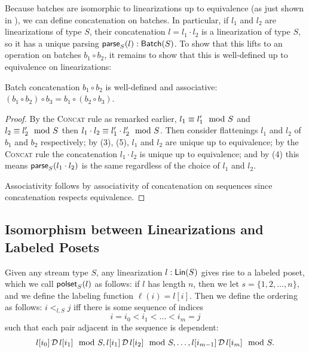 Because batches are isomorphic to linearizations up to equivalence (as just shown in ), we can define concatenation on batches. In particular, if $l_1$ and $l_2$ are linearizations of type $S$,
their concatenation $l = l_1 \cdot l_2$ is a linearization of type $S$,
so it has a unique parsing $\batchtype{\parselin{l}{S}}{S}$.
To show that this lifts to an operation on batches $b_1 \circ b_2$, it remains to show that this is well-defined up to equivalence on linearizations:
\begin{proposition}
\label{batch-concatenation-well-defined}
Batch concatenation $b_1 \circ b_2$ is well-defined and associative: $(b_1 \circ b_2) \circ b_3 = b_1 \circ (b_2 \circ b_3)$.
\end{proposition}
\begin{proof}
By the \textsc{Concat} rule as remarked earlier, $\equivtype{l_1}{l_1'}{S}$ and $\equivtype{l_2}{l_2'}{S}$
then $\equivtype{l_1 \cdot l_2}{l_1' \cdot l_2'}{S}$.
Then consider flattenings $l_1$ and $l_2$ of $b_1$ and $b_2$ respectively;
by  (3), (5),
$l_1$ and $l_2$ are unique up to equivalence;
by the \textsc{Concat} rule the concatenation $l_1 \cdot l_2$ is unique up to equivalence;
and by  (4)
this means $\parselin{l_1 \cdot l_2}{S}$ is the same regardless of the choice of $l_1$ and $l_2$.

Associativity follows by associativity of concatenation on sequences since concatenation respects equivalence.
\end{proof}

\subsection{Isomorphism between Linearizations and Labeled Posets}

Given any stream type $S$, any linearization $\lintype{l}{S}$ gives rise to a labeled poset, which we call $\posetlin{l}{S}$ as follows:
if $l$ has length $n$, then we let $s = \{1, 2, \ldots, n\}$, and we define the labeling function $\ell(i) = l[i]$.
Then we define the ordering as follows:
$i <_{l, S} j$ iff there is some sequence of indices
\[
i = i_0 < i_1 < \ldots < i_m = j
\]
such that each pair adjacent in the sequence is dependent:
\[
\deptype{l[i_0]}{l[i_1]}{S}, \deptype{l[i_1]}{l[i_2]}{S}, \ldots, \deptype{l[i_{m-1}]}{l[i_m]}{S}.
\]

